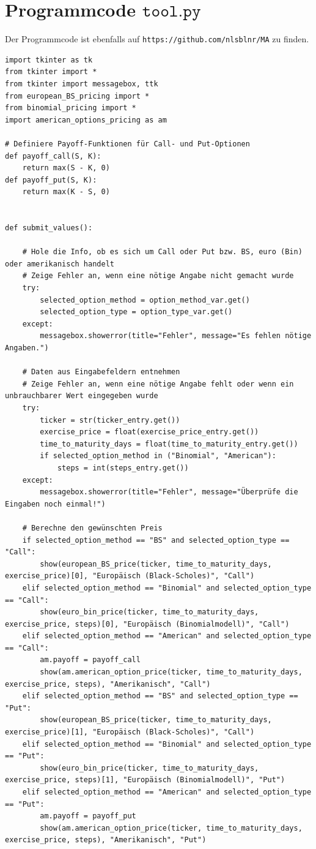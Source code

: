 \documentclass[11pt]{report} %
\begin{document}
\section{Programmcode $\texttt{tool.py}$}
Der Programmcode ist ebenfalls auf \texttt{https://github.com/nlsblnr/MA} zu finden.
\label{code:tool.py}
\begin{lstlisting}
import tkinter as tk
from tkinter import *
from tkinter import messagebox, ttk
from european_BS_pricing import *
from binomial_pricing import *
import american_options_pricing as am

# Definiere Payoff-Funktionen für Call- und Put-Optionen
def payoff_call(S, K):
    return max(S - K, 0)
def payoff_put(S, K):
    return max(K - S, 0)


def submit_values():

    # Hole die Info, ob es sich um Call oder Put bzw. BS, euro (Bin) oder amerikanisch handelt
    # Zeige Fehler an, wenn eine nötige Angabe nicht gemacht wurde
    try:
        selected_option_method = option_method_var.get()
        selected_option_type = option_type_var.get()
    except:
        messagebox.showerror(title="Fehler", message="Es fehlen nötige Angaben.")

    # Daten aus Eingabefeldern entnehmen
    # Zeige Fehler an, wenn eine nötige Angabe fehlt oder wenn ein unbrauchbarer Wert eingegeben wurde
    try:
        ticker = str(ticker_entry.get())
        exercise_price = float(exercise_price_entry.get())
        time_to_maturity_days = float(time_to_maturity_entry.get())
        if selected_option_method in ("Binomial", "American"):
            steps = int(steps_entry.get())
    except:
        messagebox.showerror(title="Fehler", message="Überprüfe die Eingaben noch einmal!")

    # Berechne den gewünschten Preis
    if selected_option_method == "BS" and selected_option_type == "Call":
        show(european_BS_price(ticker, time_to_maturity_days, exercise_price)[0], "Europäisch (Black-Scholes)", "Call")
    elif selected_option_method == "Binomial" and selected_option_type == "Call":
        show(euro_bin_price(ticker, time_to_maturity_days, exercise_price, steps)[0], "Europäisch (Binomialmodell)", "Call")
    elif selected_option_method == "American" and selected_option_type == "Call":
        am.payoff = payoff_call
        show(am.american_option_price(ticker, time_to_maturity_days, exercise_price, steps), "Amerikanisch", "Call")
    elif selected_option_method == "BS" and selected_option_type == "Put":
        show(european_BS_price(ticker, time_to_maturity_days, exercise_price)[1], "Europäisch (Black-Scholes)", "Call")
    elif selected_option_method == "Binomial" and selected_option_type == "Put":
        show(euro_bin_price(ticker, time_to_maturity_days, exercise_price, steps)[1], "Europäisch (Binomialmodell)", "Put")
    elif selected_option_method == "American" and selected_option_type == "Put":
        am.payoff = payoff_put
        show(am.american_option_price(ticker, time_to_maturity_days, exercise_price, steps), "Amerikanisch", "Put")


\end{lstlisting}
\end{document}
